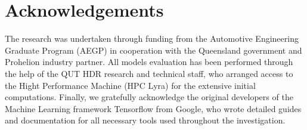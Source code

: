 \section{Acknowledgements}\label{sec:acknowledgements}
The research was undertaken through funding from the Automotive Engineering Graduate Program (AEGP) in cooperation with the Queensland government and Prohelion industry partner.
All models evaluation has been performed through the help of the QUT HDR research and technical staff, who arranged access to the Hight Performance Machine (HPC Lyra) for the extensive initial computations.
Finally, we gratefully acknowledge the original developers of the Machine Learning framework Tensorflow from Google, who wrote detailed guides and documentation for all necessary tools used throughout the investigation.
